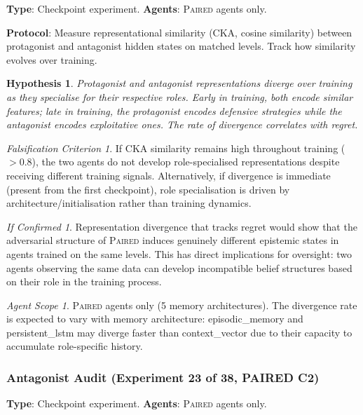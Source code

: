 \documentclass[11pt,a4paper]{article}
\newtheorem{hypothesis}{Hypothesis}[subsection]
\theoremstyle{remark}
\newtheorem*{falsification}{Falsification Criterion}
\newtheorem*{implication}{If Confirmed}
\newtheorem*{agentscope}{Agent Scope}
\newcommand{\paired}{\textsc{Paired}}
\begin{document}
\textbf{Type}: Checkpoint experiment. \textbf{Agents}: \paired{} agents only.

\textbf{Protocol}: Measure representational similarity (CKA, cosine similarity) between protagonist and antagonist hidden states on matched levels. Track how similarity evolves over training.

\begin{hypothesis}
Protagonist and antagonist representations diverge over training as they specialise for their respective roles. Early in training, both encode similar features; late in training, the protagonist encodes defensive strategies while the antagonist encodes exploitative ones. The rate of divergence correlates with regret.
\end{hypothesis}

\begin{falsification}
If CKA similarity remains high throughout training ($> 0.8$), the two agents do not develop role-specialised representations despite receiving different training signals. Alternatively, if divergence is immediate (present from the first checkpoint), role specialisation is driven by architecture/initialisation rather than training dynamics.
\end{falsification}

\begin{implication}
Representation divergence that tracks regret would show that the adversarial structure of \paired{} induces genuinely different epistemic states in agents trained on the same levels. This has direct implications for oversight: two agents observing the same data can develop incompatible belief structures based on their role in the training process.
\end{implication}

\begin{agentscope}
\paired{} agents only (5 memory architectures). The divergence rate is expected to vary with memory architecture: episodic\_memory and persistent\_lstm may diverge faster than context\_vector due to their capacity to accumulate role-specific history.
\end{agentscope}

\subsubsection{Antagonist Audit (Experiment 23 of 38, PAIRED C2)}
\label{exp:antagonist_audit}

\textbf{Type}: Checkpoint experiment. \textbf{Agents}: \paired{} agents only.
\end{document}
